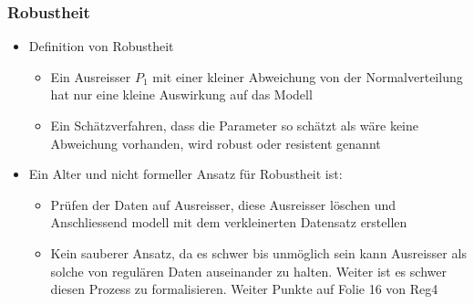 \subsubsection{Robustheit}
\begin{itemize}
	\item Definition von Robustheit
	\begin{itemize}
		\item Ein Ausreisser $P_1$ mit einer kleiner Abweichung von der Normalverteilung hat nur eine kleine Auswirkung auf das Modell
		\item Ein Schätzverfahren, dass die Parameter so schätzt als wäre keine Abweichung vorhanden, wird robust oder resistent genannt
	\end{itemize}
	\item Ein Alter und nicht formeller Ansatz für Robustheit ist:
	\begin{itemize}
		\item Prüfen der Daten auf Ausreisser, diese Ausreisser löschen und Anschliessend modell mit dem verkleinerten Datensatz erstellen
		\item Kein sauberer Ansatz, da es schwer bis unmöglich sein kann Ausreisser als solche von regulären Daten auseinander zu halten. Weiter ist es schwer diesen Prozess zu formalisieren. Weiter Punkte auf Folie 16 von Reg4
	\end{itemize}
\end{itemize}

